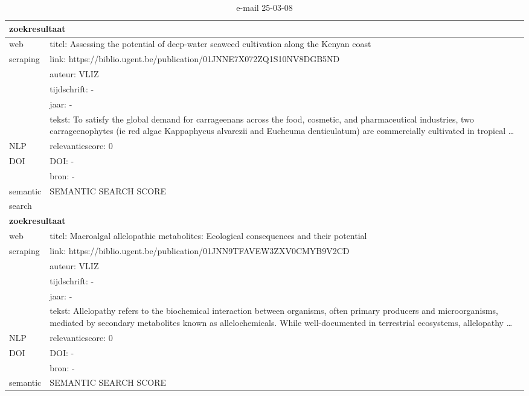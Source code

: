 \begin{table}[h!]
    \caption{e-mail 25-03-08}
    \centering
    \begin{tabularx}{\textwidth}{|p{4cm}|X|} 
        \hline
        \multicolumn{2}{|X|}{\textbf{zoekresultaat}} \\
        \hline
        web &titel:  Assessing the potential of deep-water seaweed cultivation along the Kenyan coast\\
        scraping&link: https://biblio.ugent.be/publication/01JNNE7X072ZQ1S10NV8DGB5ND\\
        &auteur: VLIZ\\
        &tijdschrift: -\\
        &jaar: -\\
        &tekst: To satisfy the global demand for carrageenans across the food, cosmetic, and pharmaceutical industries, two carrageenophytes (ie red algae Kappaphycus alvarezii and Eucheuma denticulatum) are commercially cultivated in tropical …\\
        \hline
        NLP&relevantiescore: 0\\
        \hline
        DOI&DOI: -\\
        &bron: -\\
        \hline
        semantic&SEMANTIC SEARCH SCORE\\
        search&\\
        \hline
        \multicolumn{2}{|X|}{\textbf{zoekresultaat}} \\
        \hline
        web &titel: Macroalgal allelopathic metabolites: Ecological consequences and their potential\\
        scraping&link: https://biblio.ugent.be/publication/01JNN9TFAVEW3ZXV0CMYB9V2CD\\
        &auteur: VLIZ\\
        &tijdschrift: -\\
        &jaar: -\\
        &tekst: Allelopathy refers to the biochemical interaction between organisms, often primary producers and microorganisms, mediated by secondary metabolites known as allelochemicals. While well-documented in terrestrial ecosystems, allelopathy …\\
        \hline
        NLP&relevantiescore: 0\\
        \hline
        DOI&DOI: -\\
        &bron: -\\
        \hline
        semantic&SEMANTIC SEARCH SCORE\\

\end{tabularx}
\end{table}
